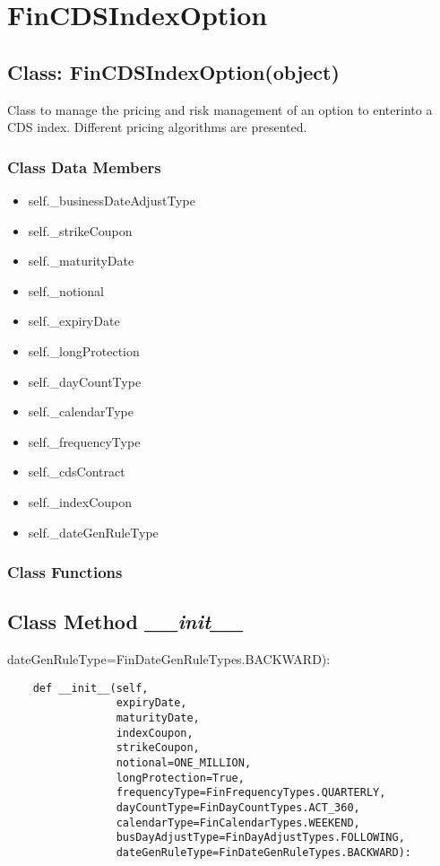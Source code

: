 \documentclass[twoside,11pt]{book}
\begin{document}
\newpage
\section{FinCDSIndexOption}

\subsection{Class: FinCDSIndexOption(object)}
Class to manage the pricing and risk management of an option to enterinto a CDS index. Different pricing algorithms are presented. 

\subsubsection{Class Data Members}
\begin{itemize}
\item{self.\_businessDateAdjustType}
\item{self.\_strikeCoupon}
\item{self.\_maturityDate}
\item{self.\_notional}
\item{self.\_expiryDate}
\item{self.\_longProtection}
\item{self.\_dayCountType}
\item{self.\_calendarType}
\item{self.\_frequencyType}
\item{self.\_cdsContract}
\item{self.\_indexCoupon}
\item{self.\_dateGenRuleType}
\end{itemize}

\subsubsection{Class Functions}

\subsection{Class Method {\it \_\_init\_\_}}
dateGenRuleType=FinDateGenRuleTypes.BACKWARD):

\begin{lstlisting}
    def __init__(self,
                 expiryDate,
                 maturityDate,
                 indexCoupon,
                 strikeCoupon,
                 notional=ONE_MILLION,
                 longProtection=True,
                 frequencyType=FinFrequencyTypes.QUARTERLY,
                 dayCountType=FinDayCountTypes.ACT_360,
                 calendarType=FinCalendarTypes.WEEKEND,
                 busDayAdjustType=FinDayAdjustTypes.FOLLOWING,
                 dateGenRuleType=FinDateGenRuleTypes.BACKWARD):
\end{lstlisting}
\end{document}
